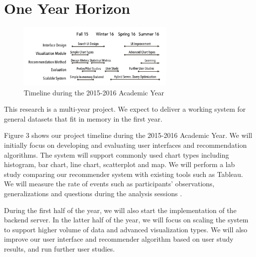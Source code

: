 \section*{One Year Horizon}

\begingroup
\setlength{\columnsep}{16pt}

\begin{figure}
\vspace{-0.4in}

  \includegraphics[width=3in]{gantt-chart.png}
  \vspace{-0.3in}
  \caption{Timeline during the 2015-2016 Academic Year}

\label{fig:plan}
\vspace{-0.1in}
\end{figure}


This research is a multi-year project.  We expect to deliver a working system for general datasets that fit in memory in the first year.

Figure 3 shows our project timeline during the 2015-2016 Academic Year.
We will initially focus on developing and evaluating user interfaces and recommendation algorithms.
The system will support commonly used chart types including histogram, bar chart, line chart, scatterplot and map.
We will perform a lab study comparing our recommender system with existing tools such as Tableau.
We will measure the rate of events such as participants’ observations, generalizations and questions during the analysis sessions \cite{liu:latency}.

\endgroup

During the first half of the year, we will also start the implementation of the backend server.  In the latter half of the year, we will focus on scaling the system to support higher volume of data and advanced visualization types. We will also improve our user interface and recommender algorithm based on user study results, and run further user studies.


